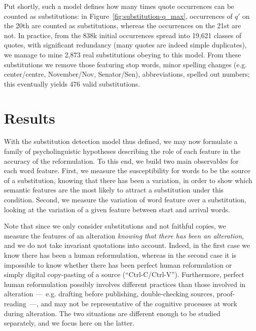 Put shortly, such a model defines how many times quote occurrences can be counted as substitutions: in Figure~\ref{fig:substitution-q_max}, occurrences of $q'$ on the 20th are counted as substitutions, whereas the occurrences on the 21st are not.  In practice, from the 838k initial occurrences spread into 19,621 classes of quotes, with significant redundancy (many quotes are indeed simple duplicates), we manage to mine 2,873 real substitutions obeying to this model. From these substitutions we remove those featuring stop words, minor spelling changes (e.g. center/centre, November/Nov, Senator/Sen), abbreviations, spelled out numbers; this eventually yields 476 valid substitutions. 


\section{Results}\label{sec:results}

With the substitution detection model thus defined, we may now formulate a family of psycholinguistic hypotheses describing the role of each feature in the accuracy of the reformulation.  To this end, we build two main observables for each word feature.  
First, we measure the susceptibility for words to be the source of a substitution, knowing that there has been a variation, in order to show which semantic features are the most likely to attract a substitution under this condition. Second, we measure the variation of word feature over a substitution, looking at the variation of a given feature between start and arrival words.

Note that since we only consider substitutions and not faithful copies, we measure the features of an alteration \emph{knowing that there has been an alteration}, and we do not take invariant quotations into account.
Indeed, in the first case we know there has been a human reformulation, whereas in the second case it is impossible to know whether there has been perfect human reformulation or simply digital copy-pasting of a source (``{\sc Ctrl-C}/{\sc Ctrl-V}'').
Furthermore, perfect human reformulation possibly involves different practices than those involved in alteration ---~e.g. drafting before publishing, double-checking sources, proof-reading~---, and may not be representative of the cognitive processes at work during alteration.
The two situations are different enough to be studied separately, and we focus here on the latter.


